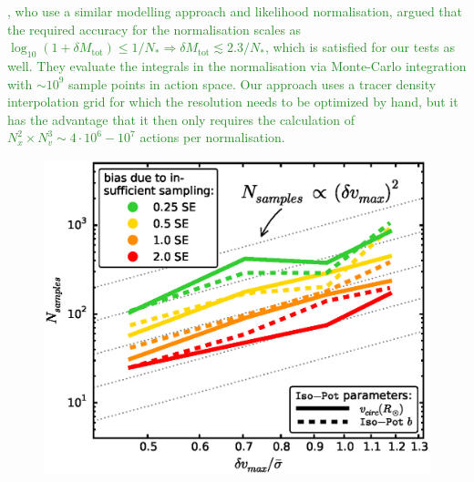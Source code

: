 \documentclass[iop,revtex4,numberedappendix,appendixfloats]{emulateapj}
\newcommand{\NEW}[1]{\textcolor{ForestGreen}{#1}}
\begin{document}
\NEW{\citet{2013MNRAS.433.1411M}, who use a similar modelling approach and likelihood normalisation, argued that the required accuracy for the normalisation scales as $\log_{10} \left(1+\delta M_\text{tot} \right) \leq 1 / N_* \Rightarrow \delta M_\text{tot} \lesssim 2.3/N_*$, which is satisfied for our tests as well.  They evaluate the integrals in the normalisation via Monte-Carlo integration with $\sim 10^9$ sample points in action space. Our approach uses a tracer density interpolation grid for which the resolution needs to be optimized by hand, but it has the advantage that it then only requires the calculation of $N_x^2 \times N_v^3 \sim 4\cdot 10^{6} - 10^7$ actions per normalisation.}

\begin{figure}[!htbp]
\centering
\includegraphics[width=\columnwidth]{figs/isoSphFlexErrConv_MC_vs_error_3.eps}

\end{figure}
\end{document}
